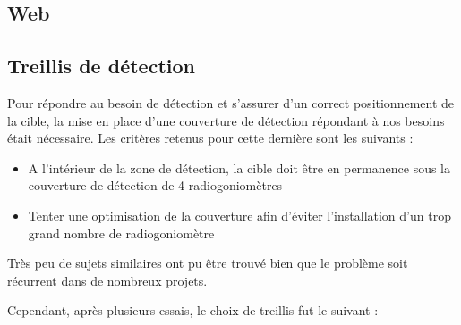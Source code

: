 \subsection{Web}


\subsection{Treillis de détection}

Pour répondre au besoin de détection et s’assurer d’un correct positionnement de la cible, la mise en
place d’une couverture de détection répondant à nos besoins était nécessaire. Les critères retenus
pour cette dernière sont les suivants :

\begin{itemize}
\item A l’intérieur de la zone de détection, la cible doit être en permanence sous la couverture de détection de 4 radiogoniomètres
\item Tenter une optimisation de la couverture afin d’éviter l’installation d’un trop grand
nombre de radiogoniomètre
\end{itemize}

Très peu de sujets similaires ont pu être trouvé bien que le problème soit récurrent dans de
nombreux projets.

Cependant, après plusieurs essais, le choix de treillis fut le suivant :

